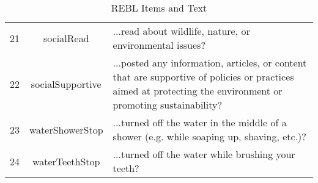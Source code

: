 \begin{table}[ht]
\begin{tabular}{ccp{7cm}}
  21 & socialRead & ...read about wildlife, nature, or environmental issues? \\ 
  22 & socialSupportive & ...posted any information, articles, or content that are supportive of policies or practices aimed at protecting the environment or promoting sustainability? \\ 
  23 & waterShowerStop & ...turned off the water in the middle of a shower (e.g. while soaping up, shaving, etc.)? \\ 
  24 & waterTeethStop & ...turned off the water while brushing your teeth? \\ 
   \hline
\end{tabular}
\endgroup
\caption{REBL Items and Text} 
\label{rebl_text}
\end{table}
